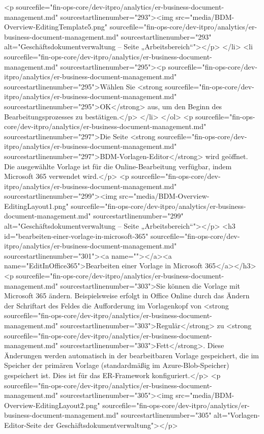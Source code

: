 <p sourcefile="fin-ops-core/dev-itpro/analytics/er-business-document-management.md" sourcestartlinenumber="293"><img src="media/BDM-Overview-EditingTemplate5.png" sourcefile="fin-ops-core/dev-itpro/analytics/er-business-document-management.md" sourcestartlinenumber="293" alt="Geschäftsdokumentverwaltung – Seite „Arbeitsbereich“"></p>
</li>
<li sourcefile="fin-ops-core/dev-itpro/analytics/er-business-document-management.md" sourcestartlinenumber="295"><p sourcefile="fin-ops-core/dev-itpro/analytics/er-business-document-management.md" sourcestartlinenumber="295">Wählen Sie <strong sourcefile="fin-ops-core/dev-itpro/analytics/er-business-document-management.md" sourcestartlinenumber="295">OK</strong> aus, um den Beginn des Bearbeitungsprozesses zu bestätigen.</p>
</li>
</ol>
<p sourcefile="fin-ops-core/dev-itpro/analytics/er-business-document-management.md" sourcestartlinenumber="297">Die Seite <strong sourcefile="fin-ops-core/dev-itpro/analytics/er-business-document-management.md" sourcestartlinenumber="297">BDM-Vorlagen-Editor</strong> wird geöffnet. Die ausgewählte Vorlage ist für die Online-Bearbeitung verfügbar, indem Microsoft 365 verwendet wird.</p>
<p sourcefile="fin-ops-core/dev-itpro/analytics/er-business-document-management.md" sourcestartlinenumber="299"><img src="media/BDM-Overview-EditingLayout1.png" sourcefile="fin-ops-core/dev-itpro/analytics/er-business-document-management.md" sourcestartlinenumber="299" alt="Geschäftsdokumentverwaltung – Seite „Arbeitsbereich“"></p>
<h3 id="bearbeiten-einer-vorlage-in-microsoft-365" sourcefile="fin-ops-core/dev-itpro/analytics/er-business-document-management.md" sourcestartlinenumber="301"><a name=""></a><a name="EditInOffice365">Bearbeiten einer Vorlage in Microsoft 365</a></h3>
<p sourcefile="fin-ops-core/dev-itpro/analytics/er-business-document-management.md" sourcestartlinenumber="303">Sie können die Vorlage mit Microsoft 365 ändern. Beispielsweise erfolgt in Office Online durch das Ändern der Schriftart des Feldes die Aufforderung im Vorlagenkopf von <strong sourcefile="fin-ops-core/dev-itpro/analytics/er-business-document-management.md" sourcestartlinenumber="303">Regulär</strong> zu <strong sourcefile="fin-ops-core/dev-itpro/analytics/er-business-document-management.md" sourcestartlinenumber="303">Fett</strong>. Diese Änderungen werden automatisch in der bearbeitbaren Vorlage gespeichert, die im Speicher der primären Vorlage (standardmäßig im Azure-Blob-Speicher) gespeichert ist. Dies ist für das ER-Framework konfiguriert.</p>
<p sourcefile="fin-ops-core/dev-itpro/analytics/er-business-document-management.md" sourcestartlinenumber="305"><img src="media/BDM-Overview-EditingLayout2.png" sourcefile="fin-ops-core/dev-itpro/analytics/er-business-document-management.md" sourcestartlinenumber="305" alt="Vorlagen-Editor-Seite der Geschäftsdokumentverwaltung"></p>
